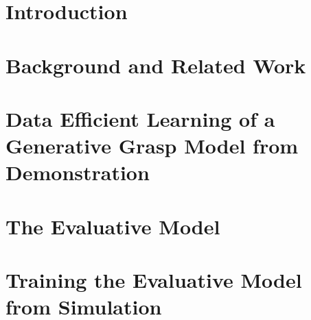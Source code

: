 \documentclass[conference]{IEEEtran}
\begin{document}
\begin{abstract}

\end{abstract}

\IEEEpeerreviewmaketitle

\section{Introduction}
% 
% 



\section{Background and Related Work}

% 
% 
% 
% 



\section{Data Efficient Learning of a Generative Grasp Model from Demonstration}

 \label{section:generative}

\section{The Evaluative Model} \label{section:learning}



\section{Training the Evaluative Model from Simulation} \label{section:simulation}

\end{document}
